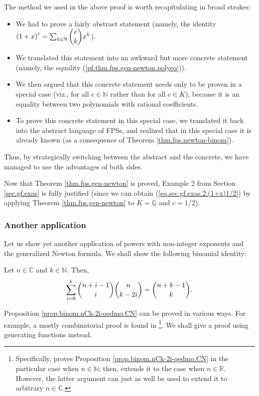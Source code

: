 The method we used in the above proof is worth recapitulating in broad strokes:

\begin{itemize}
\item We had to prove a fairly abstract statement (namely, the identity
$\left(  1+x\right)  ^{c}=\sum_{k\in\mathbb{N}}\dbinom{c}{k}x^{k}$).

\item We translated this statement into an awkward but more concrete statement
(namely, the equality (\ref{pf.thm.fps.gen-newton.polyeq})).

\item We then argued that this concrete statement needs only to be proven in a
special case (viz., for all $c\in\mathbb{N}$ rather than for all $c\in K$),
because it is an equality between two polynomials with rational coefficients.

\item To prove this concrete statement in this special case, we translated it
back into the abstract language of FPSs, and realized that in this special
case it is already known (as a consequence of Theorem
\ref{thm.fps.newton-binom}).
\end{itemize}

Thus, by strategically switching between the abstract and the concrete, we
have managed to use the advantages of both sides.

Now that Theorem \ref{thm.fps.gen-newton} is proved, Example 2 from Section
\ref{sec.gf.exas} is fully justified (since we can obtain
(\ref{eq.sec.gf.exas.2.(1+x)1/2}) by applying Theorem \ref{thm.fps.gen-newton}
to $K=\mathbb{Q}$ and $c=1/2$).

\subsubsection{Another application}

Let us show yet another application of powers with non-integer exponents and
the generalized Newton formula. We shall show the following binomial identity:

\begin{proposition}
\label{prop.binom.nCk-2i-qedmo.CN}Let $n\in\mathbb{C}$ and $k\in\mathbb{N}$.
Then,%
\[
\sum_{i=0}^{k}\dbinom{n+i-1}{i}\dbinom{n}{k-2i}=\dbinom{n+k-1}{k}.
\]

\end{proposition}

Proposition \ref{prop.binom.nCk-2i-qedmo.CN} can be proved in various ways.
For example, a mostly combinatorial proof is found in \cite[Exercise 2.10.7
and Exercise 2.10.8]{19fco}\footnote{Specifically, \cite[Exercise
2.10.7]{19fco} proves Proposition \ref{prop.binom.nCk-2i-qedmo.CN} in the
particular case when $n\in\mathbb{N}$; then, \cite[Exercise 2.10.8]{19fco}
extends it to the case when $n\in\mathbb{R}$. However, the latter argument can
just as well be used to extend it to arbitrary $n\in\mathbb{C}$.}. We shall
give a proof using generating functions instead.

